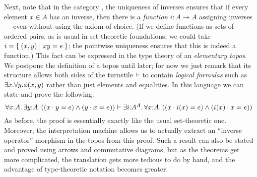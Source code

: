 Next, note that in the category \bSet, the uniqueness of inverses ensures that if every element $x\in A$ has an inverse, then there is a \emph{function} $i:A\to A$ assigning inverses --- even without using the axiom of choice.
(If we define functions as sets of ordered pairs, as is usual in set-theoretic foundations, we could take $i = \Set{(x,y) | xy=e}$; the pointwise uniqueness ensures that this is indeed a function.)
This fact can be expressed in the type theory of an \emph{elementary topos}.
We postpone the definition of a topos until later; for now we just remark that its structure allows both sides of the turnstile $\vdash$ to contain \emph{logical formulas} such as $\exis x. \all y. \phi(x,y)$ rather than just elements and equalities.
In this language we can state and prove the following:
\[ \forall x:A. \exists y:A. ((x\cdot y = e) \land (y\cdot x = e)) \types
\exists i:A^A. \forall x:A. ((x\cdot i(x) = e) \land (i(x)\cdot x = e))
\]
As before, the proof is essentially exactly like the usual set-theoretic one.
Moreover, the interpretation machine allows us to actually extract an ``inverse operator'' morphism in the topos from this proof.
Such a result can also be stated and proved using arrows and commutative diagrams, but as the theorems get more complicated, the translation gets more tedious to do by hand, and the advantage of type-theoretic notation becomes greater.

